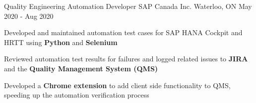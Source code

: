 \begin{cventries}
  \cventry
    {Quality Engineering Automation Developer} %
    {SAP Canada Inc.} %
    {Waterloo, ON} %
    {May 2020 - Aug 2020} %
    {
      \begin{cvitems} %
      \item {Developed and maintained automation test cases for SAP HANA Cockpit and HRTT using \textbf{Python} and \textbf{Selenium}}
		  \item {Reviewed automation test results for failures and logged related issues to \textbf{JIRA} and the \textbf{Quality Management System (QMS)}}
		  \item {Developed a \textbf{Chrome extension} to add client side functionality to QMS, speeding up the automation verification process}
      \end{cvitems}
    }
       
\end{cventries}
